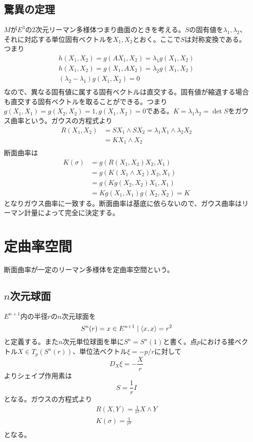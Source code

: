     \subsection{驚異の定理}

        $M$が$E^3$の2次元リーマン多様体つまり曲面のときを考える。$S$の固有値を$\lambda_1, \lambda_2$、それに対応する単位固有ベクトルを$X_1, X_2$とおく。ここで$S$は対称変換である。つまり
        \begin{gather*}
            h(X_1, X_2) = g(AX_1, X_2) = \lambda_1g(X_1, X_2)\\
            h(X_1, X_2) = g(X_1, AX_2) = \lambda_2g(X_1, X_2)\\
            (\lambda_2 - \lambda_1)g(X_1, X_2) = 0\\
        \end{gather*}
        なので、異なる固有値に属する固有ベクトルは直交する。固有値が縮退する場合も直交する固有ベクトルを取ることができる。つまり$g(X_1, X_1) = g(X_2, X_2) = 1, g(X_1, X_2) = 0$である。$K = \lambda_1\lambda_2 = \det S$をガウス曲率という。ガウスの方程式より
        \begin{align*}
            R(X_1, X_2)
            &= SX_1 \wedge SX_2 = \lambda_1X_1 \wedge \lambda_2X_2\\
            &= KX_1 \wedge X_2\\
        \end{align*}
        断面曲率は
        \begin{align*}
            K(\sigma) &= g(R(X_1, X_2)X_2, X_1)\\
            &= g(K(X_1 \wedge X_2)X_2, X_1)\\
            &= g(Kg(X_2, X_2)X_1, X_1)\\
            &= Kg(X_1, X_1)g(X_2, X_2) = K
        \end{align*}
        となりガウス曲率に一致する。断面曲率は基底に依らないので、ガウス曲率はリーマン計量によって完全に決定する。

\section{定曲率空間}
    断面曲率が一定のリーマン多様体を定曲率空間という。
    \subsection{$n$次元球面}
        $E^{n+1}$内の半径$r$の$n$次元球面を
            \[S^n(r) = {x \in E^{n+1} \mid \langle x, x\rangle = r^2}\]
        と定義する。また$n$次元単位球面を単に$S^n = S^n(1)$と書く。点$p$における接ベクトル$X \in T_p(S^n(r))$、単位法ベクトル$\xi = -p/r$に対して
            \[D_X\xi = -\frac{X}{r}\]
        よりシェイプ作用素は
            \[S = \frac{1}{r}I\]
        となる。ガウスの方程式より
        \begin{align*}
            R(X, Y) = \frac{1}{r^2}X \wedge Y\\
            K(\sigma) = \frac{1}{r^2}\\
        \end{align*}
        となる。

